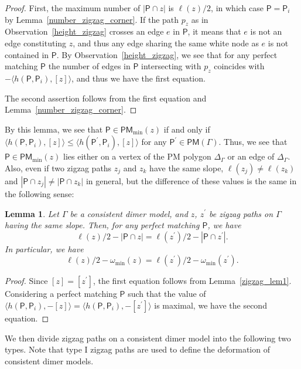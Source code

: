 \documentclass[pdftex]{sigma}%
\numberwithin{equation}{section}
\numberwithin{figure}{section}
\numberwithin{table}{section}
\newtheorem{Lemma}[Theorem]{Lemma}
\newcommand{\sfP}{\mathsf{P}}
\newcommand{\PM}{\mathsf{PM}}
\begin{document}
\begin{proof}
First, the maximum number of $|\sfP\cap z|$ is $\ell(z)/2$, in which case $\sfP=\sfP_i$ by Lemma~\ref{number_zigzag_corner}.
If the path $p_z$ as in Observation~\ref{height_zigzag} crosses an edge $e$ in $\sfP$, it means that $e$ is not an edge constituting $z$, and thus any edge sharing the same white node as $e$ is not contained in $\sfP$.
By Observation~\ref{height_zigzag}, we see that for any perfect matching $\sfP$ the number of edges in $\sfP$ intersecting with $p_z$ coincides with $-\langle h(\sfP,\sfP_i),[z]\rangle$, and thus we have the first equation.

The second assertion follows from the first equation and Lemma~\ref{number_zigzag_corner}.
\end{proof}

By this lemma, we see that $\sfP\in\PM_{\min}(z)$ if and only if $\langle h(\sfP,\sfP_i),[z]\rangle{\le} \langle h(\sfP^\prime,\sfP_i),[z]\rangle$ for any $\sfP^\prime\in\PM(\Gamma)$.
Thus, we see that $\sfP\in\PM_{\min}(z)$ lies either on a vertex of the PM polygon $\Delta_\Gamma$ or an edge of $\Delta_\Gamma$.
Also, even if two zigzag paths $z_j$ and $z_k$ have the same slope, $\ell(z_j)\neq\ell(z_k)$ and $|\sfP\cap z_j|\neq|\sfP\cap z_k|$ in general,
but the difference of these values is the same in the following sense:

\begin{Lemma}\label{zigzag_lem2}
Let $\Gamma$ be a consistent dimer model, and $z$, $z^\prime$ be zigzag paths on $\Gamma$ having the same slope.
Then, for any perfect matching $\sfP$, we have
\begin{displaymath}
\ell(z)/2-|\sfP\cap z|=\ell(z^\prime)/2-|\sfP\cap z^\prime|.
\end{displaymath}
In particular, we have
\begin{displaymath}
\ell(z)/2-\omega_{\min}(z)=\ell(z^\prime)/2-\omega_{\min}(z^\prime).
\end{displaymath}
\end{Lemma}

\begin{proof}Since $[z]=[z^\prime]$, the first equation follows from Lemma~\ref{zigzag_lem1}.
Considering a perfect matching $\sfP$ such that the value of $\langle h(\sfP,\sfP_i),-[z]\rangle=\langle h(\sfP,\sfP_i),-[z^\prime]\rangle$ is maximal, we have the second equation.
\end{proof}

We then divide zigzag paths on a consistent dimer model into the following two types. Note that type I zigzag paths are used to define the deformation of consistent dimer models.
\end{document}
